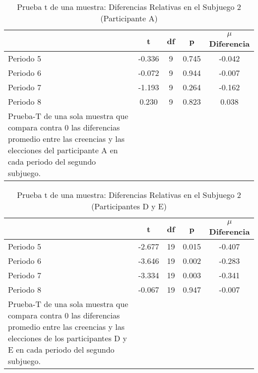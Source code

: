 \begin{table}[h]
\caption[Prueba t de una muestra: Diferencias Relativas en el Subjuego 2 (Participante A)]{Prueba t de una muestra: Diferencias Relativas en el Subjuego 2 (Participante A)}
\label{DN-S1}
\centering
\begin{tabular}{l | c c c | c}
\toprule
\textbf{} & \textbf{t} & \textbf{df} & \textbf{p} & \textbf{$\mu$Diferencia}\\
\midrule
Periodo 5 & -0.336 & 9 & 0.745 & -0.042\\
Periodo 6 & -0.072 & 9 & 0.944 & -0.007\\
Periodo 7 & -1.193 & 9 & 0.264 & -0.162\\
Periodo 8 & 0.230 & 9 & 0.823 & 0.038\\
\bottomrule
Prueba-T de una sola muestra que compara contra 0 las diferencias promedio entre las creencias y las elecciones del participante A en cada periodo del segundo subjuego.
\end{tabular}
\end{table}











\begin{table}[h]
\caption[Prueba t de una muestra: Diferencias Relativas en el Subjuego 2 (Participantes D y E)]{Prueba t de una muestra: Diferencias Relativas en el Subjuego 2 (Participantes D y E)}
\label{DN-S1}
\centering
\begin{tabular}{l | c c c | c}
\toprule
\textbf{} & \textbf{t} & \textbf{df} & \textbf{p} & \textbf{$\mu$Diferencia}\\
\midrule
Periodo 5 & -2.677 & 19 & 0.015 & -0.407\\
Periodo 6 & -3.646 & 19 & 0.002 & -0.283\\
Periodo 7 & -3.334 & 19 & 0.003 & -0.341\\
Periodo 8 & -0.067 & 19 & 0.947 & -0.007\\
\bottomrule
Prueba-T de una sola muestra que compara contra 0 las diferencias promedio entre las creencias y las elecciones de los participantes D y E en cada periodo del segundo subjuego.
\end{tabular}
\end{table}


















